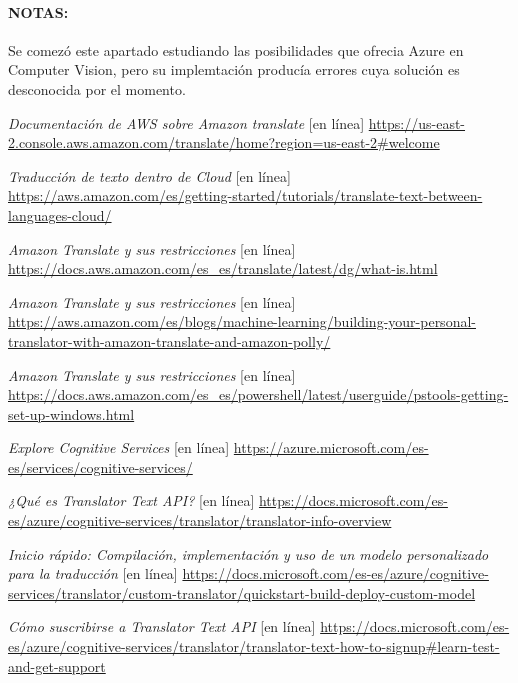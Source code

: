 \documentclass[english,runningheads,a4paper]{llncs}[2018/03/10]
\begin{document}
    
    \paragraph{NOTAS:} Se comezó este apartado estudiando las posibilidades que ofrecia Azure en Computer Vision, pero su implemtación producía errores cuya solución es desconocida por el momento.
    
    \begin{thebibliography}{8}
        
        
        \textit{Documentación de AWS sobre Amazon translate} [en línea] \url{https://us-east-2.console.aws.amazon.com/translate/home?region=us-east-2#welcome}
        
        \textit{Traducción de texto dentro de Cloud} [en línea] \url{https://aws.amazon.com/es/getting-started/tutorials/translate-text-between-languages-cloud/}
        
        \textit{Amazon Translate y sus restricciones} [en línea] \url{https://docs.aws.amazon.com/es_es/translate/latest/dg/what-is.html}
        
        \textit{Amazon Translate y sus restricciones} [en línea] \url{https://aws.amazon.com/es/blogs/machine-learning/building-your-personal-translator-with-amazon-translate-and-amazon-polly/}
        
        \textit{Amazon Translate y sus restricciones} [en línea] \url{https://docs.aws.amazon.com/es_es/powershell/latest/userguide/pstools-getting-set-up-windows.html}
        
        \textit{Explore Cognitive Services} [en línea] \url{https://azure.microsoft.com/es-es/services/cognitive-services/}
        
        \textit{¿Qué es Translator Text API?} [en línea] \url{https://docs.microsoft.com/es-es/azure/cognitive-services/translator/translator-info-overview}
        
        \textit{Inicio rápido: Compilación, implementación y uso de un modelo personalizado para la traducción} [en línea] \url{https://docs.microsoft.com/es-es/azure/cognitive-services/translator/custom-translator/quickstart-build-deploy-custom-model}
        
        \textit{Cómo suscribirse a Translator Text API} [en línea] \url{https://docs.microsoft.com/es-es/azure/cognitive-services/translator/translator-text-how-to-signup#learn-test-and-get-support}
        

\end{thebibliography}
\end{document}
